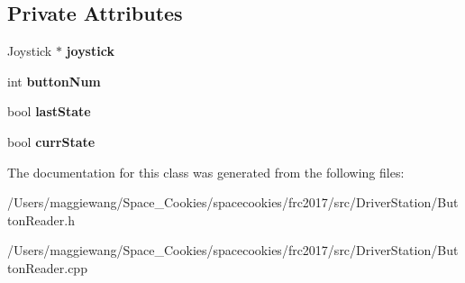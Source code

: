 \subsection*{Private Attributes}
\begin{DoxyCompactItemize}
\item 
\mbox{\label{class_button_reader_aac4f8ee19043c203be56abf375e8b319}} 
Joystick $\ast$ {\bfseries joystick}
\item 
\mbox{\label{class_button_reader_a92bac462d8bc6ee16fea40c13ff50e95}} 
int {\bfseries button\+Num}
\item 
\mbox{\label{class_button_reader_a6fab0789d8dd7b5c424e7fa3c12d4ca9}} 
bool {\bfseries last\+State}
\item 
\mbox{\label{class_button_reader_a1d139e4dbe81f6b1942b5f74c56b6492}} 
bool {\bfseries curr\+State}
\end{DoxyCompactItemize}


The documentation for this class was generated from the following files\+:\begin{DoxyCompactItemize}
\item 
/\+Users/maggiewang/\+Space\+\_\+\+Cookies/spacecookies/frc2017/src/\+Driver\+Station/Button\+Reader.\+h\item 
/\+Users/maggiewang/\+Space\+\_\+\+Cookies/spacecookies/frc2017/src/\+Driver\+Station/Button\+Reader.\+cpp\end{DoxyCompactItemize}
